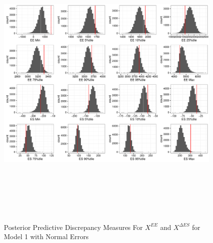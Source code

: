 \documentclass[11pt]{article}\usepackage[]{graphicx}\usepackage[]{color}
\begin{document}
 \begin{figure}
  \centering
  \includegraphics[width=17cm,height=15cm]{manual_figure/wpxdiag1.pdf}
  \caption{Posterior Predictive Discrepancy Measures For $X^{EE}$ and $X^{\Delta ES}$ for Model 1 with Normal Errors}
  \label{wpxdiag1}
  \end{figure}
\end{document}

